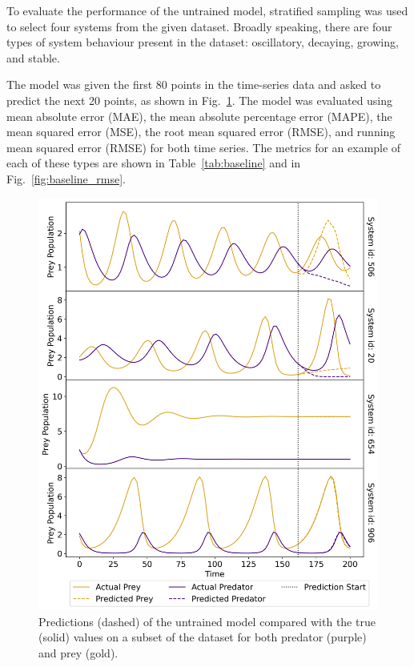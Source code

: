 \documentclass[11pt,a4paper]{article}
\begin{document}
To evaluate the performance of the untrained model, stratified sampling was used to select four systems from the given dataset. Broadly speaking, there are four types of system behaviour present in the dataset: oscillatory, decaying, growing, and stable. 

The model was given the first 80 points in the time-series data and asked to predict the next 20 points, as shown in Fig.~\ref{fig:baseline_pred}. The model was evaluated using mean absolute error (MAE), the mean absolute percentage error (MAPE), the mean squared error (MSE), the root mean squared error (RMSE), and running mean squared error (RMSE) for both time series. The metrics for an example of each of these types are shown in Table~\ref{tab:baseline} and in Fig.~\ref{fig:baseline_rmse}.

\begin{figure}[h]
    \centering
    \includegraphics[width=\columnwidth, keepaspectratio]{../plots/predictions_example.png}
    \caption{Predictions (dashed) of the untrained model compared with the true (solid) values on a subset of the dataset for both predator (purple) and prey (gold).}
    \label{fig:baseline_pred}
\end{figure}
\end{document}
